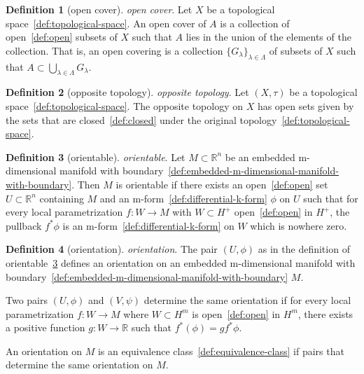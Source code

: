 \documentclass[12pt,a4paper]{article}
\theoremstyle{definition}
\newtheorem{definition}{Definition}
\begin{document}
\begin{definition}[open cover]\label{def:open-cover}
\emph{open cover}. Let $X$ be a topological space~\ref{def:topological-space}. An open cover of $A$ is a collection of open~\ref{def:open} subsets of $X$ such that $A$ lies in the union of the elements of the collection. That is, an open covering is a collection $\{G_\lambda\}_{\lambda\in\Lambda}$ of subsets of $X$ such that $A\subset \bigcup\limits_{\lambda\in\Lambda} G_\lambda$.
\end{definition}

\begin{definition}[opposite topology]\label{def:opposite-topology}
\emph{opposite topology}. Let $(X,\tau)$ be a topological space~\ref{def:topological-space}. The opposite topology on  $X$ has open sets given by the sets that are closed~\ref{def:closed} under the original topology~\ref{def:topological-space}.
\end{definition}

\begin{definition}[orientable]\label{def:orientable}
\emph{orientable}. Let $M\subset\mathbb R^n$ be an embedded m-dimensional manifold with boundary~\ref{def:embedded-m-dimensional-manifold-with-boundary}. Then $M$ is orientable if there exists an open~\ref{def:open} set $U \subset\mathbb R^n$ containing $M$ and an m-form~\ref{def:differential-k-form} $\phi$ on $U$ such that for every local parametrization $f:W\to M$ with $W \subset H^+$ open~\ref{def:open} in $H^+$, the pullback $f^*\phi$ is an m-form~\ref{def:differential-k-form} on $W$ which is nowhere zero.
\end{definition}

\begin{definition}[orientation]\label{def:orientation}
\emph{orientation}. The pair $(U,\phi)$ as in the definition of orientable~\ref{def:orientable} defines an orientation on an embedded m-dimensional manifold with boundary~\ref{def:embedded-m-dimensional-manifold-with-boundary} $M$.

Two pairs $(U,\phi)$ and $(V,\psi)$ determine the same orientation if for every local parametrization $f:W\to M$ where $W \subset H^m$ is open~\ref{def:open} in $H^m$, there exists a positive function $g:W\to\mathbb R$ such that $f^*(\phi) = gf^*\phi$.

An orientation on $M$ is an equivalence class~\ref{def:equivalence-class} if pairs that determine the same orientation on $M$.
\end{definition}
\end{document}
